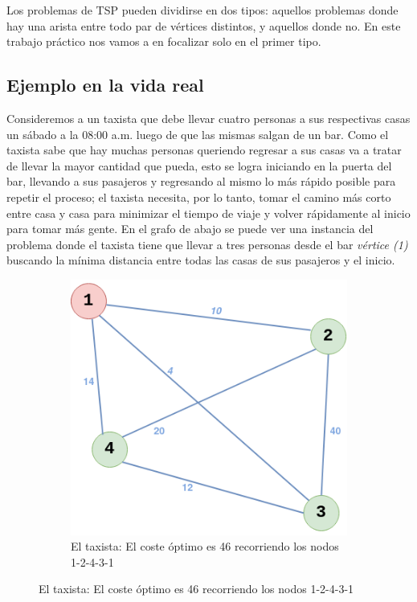 \documentclass[10pt,a4paper]{article}
\begin{document}
Los problemas de TSP pueden dividirse en dos tipos: aquellos problemas donde hay una arista entre todo par de vértices distintos, y aquellos donde no. En este trabajo práctico nos vamos a en focalizar solo en el primer tipo. 

\subsection{Ejemplo en la vida real}
Consideremos a un taxista que debe llevar cuatro personas a sus respectivas casas un sábado a la 08:00 a.m. luego de que las mismas salgan de un bar. Como el taxista sabe que hay muchas personas queriendo regresar a sus casas va a tratar de llevar la mayor cantidad que pueda, esto se logra iniciando en la puerta del bar, llevando a sus pasajeros y regresando al mismo lo más rápido posible para repetir el proceso; el taxista necesita, por lo tanto, tomar el camino más corto entre casa y casa para minimizar el tiempo de viaje y volver rápidamente al inicio para tomar más gente. En el grafo de abajo se puede ver una instancia del problema donde el taxista tiene que llevar a tres personas desde el bar \textit{vértice (1)} buscando la mínima distancia entre todas las casas de sus pasajeros y el inicio.

\begin{figure} [H]
    \centering
    \begin{subfigure}{0.4\linewidth}
        \centering
        \includegraphics[scale=0.4]{img/taxi.png}
        \caption{El taxista: El coste óptimo es 46 recorriendo los nodos 1-2-4-3-1}
        \label{fig:camino taxista}
    \end{subfigure}
\end{figure}
\end{document}
